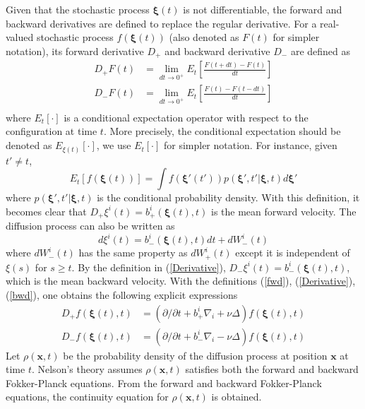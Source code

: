 \documentclass[%
 aip, 
 amsmath,amssymb,amsthm,
 nofootinbib,
 reprint,
]{revtex4-1}
\begin{document}
Given that the stochastic process $\mathbf{\xi}(t)$ is not differentiable, the forward and backward derivatives are defined to replace the regular derivative. For a real-valued stochastic process $f(\mathbf{\xi}(t))$ (also denoted as $F(t)$ for simpler notation), its forward derivative $D_+$ and backward derivative $D_-$ are defined as~\cite{Nelson}
\begin{equation}
\label{Derivative}
\begin{split}
    D_+F(t) &= \lim_{dt\to 0^+} E_t [\frac{F(t+dt)-F(t)}{dt}] \\
    D_-F(t) &= \lim_{dt\to 0^+} E_t [\frac{F(t)-F(t-dt)}{dt}] \\
\end{split}
\end{equation}
where $E_t[\cdot]$ is a conditional expectation operator with respect to the configuration at time $t$. More precisely, the conditional expectation should be denoted as $E_{\xi(t)}[\cdot]$, we use $E_t[\cdot]$ for simpler notation. For instance, given $t'\ne t$, 
\begin{equation}
\label{Et}
    E_t[f(\mathbf{\xi}(t))] = \int f(\mathbf{\xi}'(t'))p(\mathbf{\xi}',t'|\mathbf{\xi},t)d\mathbf{\xi}'
\end{equation}
where $p(\mathbf{\xi}',t'|\mathbf{\xi},t)$ is the conditional probability density. With this definition, it becomes clear that $D_+\xi^i(t) = b^i_+(\mathbf{\xi}(t),t)$ is the mean forward velocity. The diffusion process can also be written as 
\begin{equation}
\label{bwd}
    d\xi^i(t) = b^i_-(\mathbf{\xi}(t), t)dt + dW^i_-(t)
\end{equation}
where $dW^i_-(t)$ has the same property as $dW^i_+(t)$ except it is independent of $\xi(s)$ for $s\geq t$. By the definition in (\ref{Derivative}), $D_-\xi^i(t) = b^i_-(\mathbf{\xi}(t),t)$, which is the mean backward velocity. With the definitions (\ref{fwd}), (\ref{Derivative}), (\ref{bwd}), one obtains the following explicit expressions
\begin{equation}
    \label{Df}
    \begin{split}
    D_+f(\mathbf{\xi}(t), t) &= (\partial /\partial t + {b_+^i}\nabla_i +\nu\Delta)f(\mathbf{\xi}(t), t) \\
    D_-f(\mathbf{\xi}(t), t) &= (\partial /\partial t + {b_-^i}\nabla_i -\nu\Delta)f(\mathbf{\xi}(t), t)
    \end{split}
\end{equation}
Let $\rho(\mathbf{x},t)$ be the probability density of the diffusion process at position $\mathbf{x}$ at time $t$. Nelson's theory assumes $\rho(\mathbf{x},t)$ satisfies both the forward and backward Fokker-Planck equations. From the forward and backward Fokker-Planck equations, the continuity equation for $\rho(\mathbf{x},t)$ is obtained.
\end{document}
